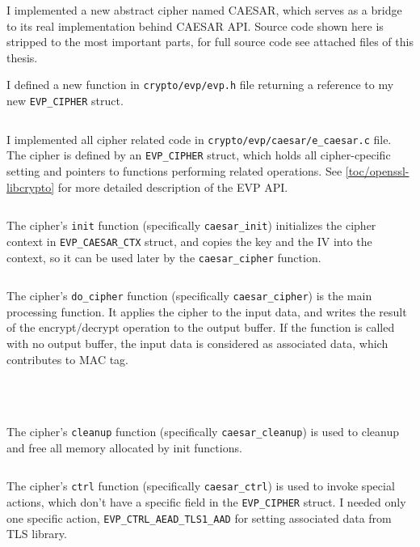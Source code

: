 I implemented a new abstract cipher named CAESAR, which serves as a bridge to its real implementation behind CAESAR API. Source code shown here is stripped to the most important parts, for full source code see attached files of this thesis.

I defined a new function in \texttt{crypto/evp/evp.h} file returning a reference to my new \texttt{EVP\_CIPHER} struct.

\inputminted{c}{code/openssl-evp-caesar.c}

I implemented all cipher related code in \texttt{crypto/evp/caesar/e\_caesar.c} file. The cipher is defined by an \texttt{EVP\_CIPHER} struct, which holds all cipher-cpecific setting and pointers to functions performing related operations. See \autoref{toc/openssl-libcrypto} for more detailed description of the EVP API.

\inputminted{c}{code/openssl/crypto/evp/caesar/e_caesar.c}

The cipher's \texttt{init} function (specifically \texttt{caesar\_init}) initializes the cipher context in \texttt{EVP\_CAESAR\_CTX} struct, and copies the key and the IV into the context, so it can be used later by the \texttt{caesar\_cipher} function.

\inputminted{c}{code/openssl/crypto/evp/caesar/e_caesar_init.c}

The cipher's \texttt{do\_cipher} function (specifically \texttt{caesar\_cipher}) is the main processing function. It applies the cipher to the input data, and writes the result of the encrypt/decrypt operation to the output buffer. If the function is called with no output buffer, the input data is considered as associated data, which contributes to MAC tag.

\inputminted{c}{code/openssl/crypto/evp/caesar/e_caesar_cipher.c}
\inputminted{c}{code/openssl/crypto/evp/caesar/e_caesar_set_ad.c}
\inputminted{c}{code/openssl/crypto/evp/caesar/e_caesar_encrypt.c}
\inputminted{c}{code/openssl/crypto/evp/caesar/e_caesar_decrypt.c}

The cipher's \texttt{cleanup} function (specifically \texttt{caesar\_cleanup}) is used to cleanup and free all memory allocated by init functions.

\inputminted{c}{code/openssl/crypto/evp/caesar/e_caesar_cleanup.c}

The cipher's \texttt{ctrl} function (specifically \texttt{caesar\_ctrl}) is used to invoke special actions, which don't have a specific field in the \texttt{EVP\_CIPHER} struct. I needed only one specific action, \texttt{EVP\_CTRL\_AEAD\_TLS1\_AAD} for setting associated data from TLS library.

